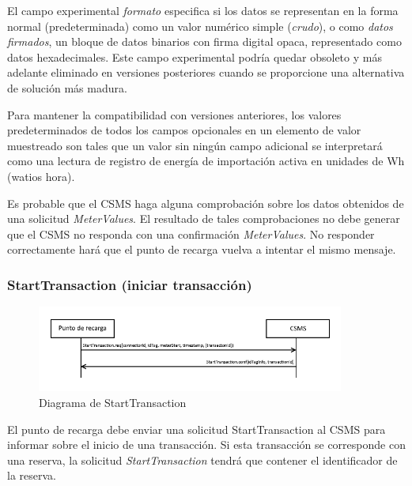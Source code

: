 \documentclass[12pt,a4paper,onecolumn,oneside]{report}
\begin{document}
El campo experimental \textit{formato} especifica si los datos se representan en la forma normal (predeterminada) como un valor numérico simple (\textit{crudo}), o como \textit{datos firmados}, un bloque de datos binarios con firma digital opaca, representado como datos hexadecimales. Este campo experimental podría quedar obsoleto y más adelante eliminado en versiones posteriores cuando se proporcione una alternativa de solución más madura.

Para mantener la compatibilidad con versiones anteriores, los valores predeterminados de todos los campos opcionales en un elemento de valor muestreado son tales que un valor sin ningún campo adicional se interpretará como una lectura de registro de energía de importación activa en unidades de Wh (watios hora).

Es probable que el CSMS haga alguna comprobación sobre los datos obtenidos de una solicitud \textit{MeterValues}. El resultado de tales comprobaciones no debe generar que el CSMS no responda con una confirmación \textit{MeterValues}. No responder correctamente hará que el punto de recarga vuelva a intentar el mismo mensaje.



\subsubsection{StartTransaction (iniciar transacción)}
\label{StartTransaction (iniciar transacción)}


\begin{figure}[H] 
\centering
  \includegraphics[width=0.9\textwidth]{figuras/diagramastarttransaction.png}
  \caption[Diagrama de \textit{StartTransaction}]{Diagrama de StartTransaction\\
  }
  \label{fig:diagramastarttransaction}
\end{figure}


El punto de recarga debe enviar una solicitud StartTransaction al CSMS para informar sobre el inicio de una transacción. Si esta transacción se corresponde con una reserva, la solicitud \textit{StartTransaction} tendrá que contener el identificador de la reserva.
\end{document}
